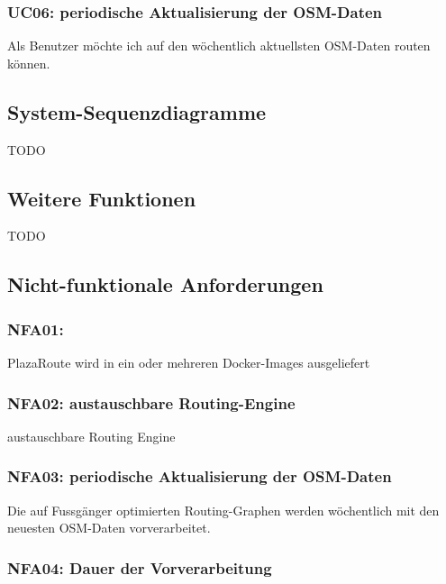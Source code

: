 \subsubsection{UC06: periodische Aktualisierung der OSM-Daten}
\label{usecase:UC06}

Als Benutzer möchte ich auf den wöchentlich aktuellsten \ac{OSM}-Daten routen können.

\subsection{System-Sequenzdiagramme}
\label{sub:System-Sequenzdiagramme}

TODO

\subsection{Weitere Funktionen}
\label{sub:Weitere Funktionen}

TODO

\subsection{Nicht-funktionale Anforderungen}
\label{sub:Nicht-funktionale Anforderungen}

\subsubsection{NFA01: }
\label{NFA:NFA01}

PlazaRoute wird in ein oder mehreren Docker-Images ausgeliefert

\subsubsection{NFA02: austauschbare Routing-Engine}
\label{NFA:NFA02}

austauschbare Routing Engine

\subsubsection{NFA03: periodische Aktualisierung der OSM-Daten}
\label{NFA:NFA03}

Die auf Fussgänger optimierten Routing-Graphen werden wöchentlich mit den neuesten \ac{OSM}-Daten vorverarbeitet.

\subsubsection{NFA04: Dauer der Vorverarbeitung}
\label{NFA:NFA04}

